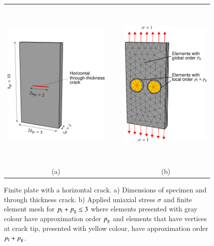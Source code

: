 \documentclass[11pt]{acmeArticle}
\numberwithin{equation}{section}
\begin{document}
\begin{figure}[h!]
\begin{center}
\begin{tabular}{c c c c}
 \includegraphics[height=8.5cm]{Figures/InfSlab.pdf} & &   & {\includegraphics[height=8.5cm]{Figures/InfSlabMeshs.pdf}}\\  
(a) & &  & (b) 
\end{tabular}
\caption{Finite plate with a horizontal crack. a) Dimensions of specimen and through thickness crack. b) Applied uniaxial stress $\sigma$ and finite element mesh for $p_{\rm l} + p_{\rm g} \leq 3$ where elements presented with gray colour have approximation order $p_{\rm g}$ and elements that have vertices at crack tip, presented with yellow colour, have approximation order $p_{\rm l}+p_{\rm g}$.}
\label{fig:plate_load_mesh}
\end{center}
\end{figure}
\end{document}
